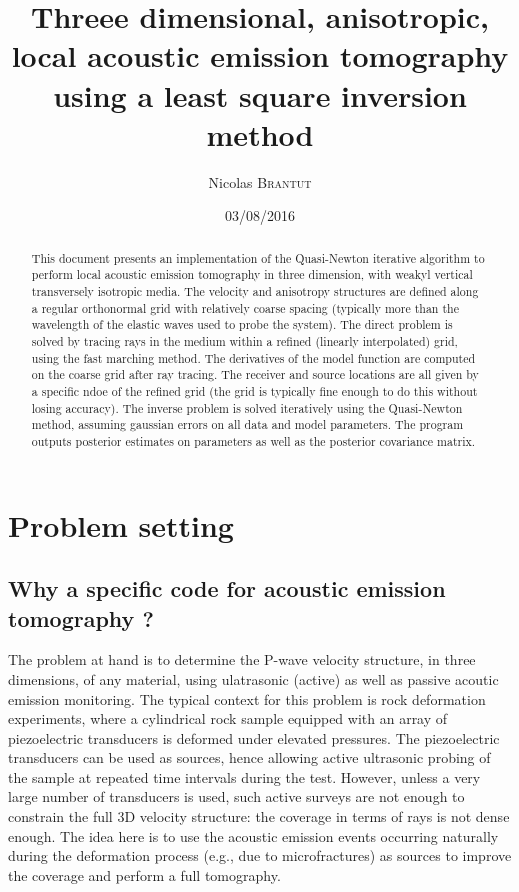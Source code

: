 \documentclass{article}
\title{Threee dimensional, anisotropic, local acoustic emission tomography using a least square inversion method}
\author{Nicolas \textsc{Brantut}}
\date{03/08/2016}
\begin{document}
\maketitle

\begin{abstract}
This document presents an implementation of the Quasi-Newton iterative algorithm to perform local acoustic emission tomography in three dimension, with weakyl vertical transversely isotropic media. The velocity and anisotropy structures are defined along a regular orthonormal grid with relatively coarse spacing (typically more than the wavelength of the elastic waves used to probe the system). The direct problem is solved by tracing rays in the medium within a refined (linearly interpolated) grid, using the fast marching method. The derivatives of the model function are computed on the coarse grid after ray tracing. The receiver and source locations are all given by a specific ndoe of the refined grid (the grid is typically fine enough to do this without losing accuracy). The inverse problem is solved iteratively using the Quasi-Newton method, assuming gaussian errors on all data and model parameters. The program outputs posterior estimates on parameters as well as the posterior covariance matrix.
\end{abstract}

\section{Problem setting}

\subsection{Why a specific code for acoustic emission tomography ?}

The problem at hand is to determine the P-wave velocity structure, in three dimensions, of any material, using ulatrasonic (active) as well as passive acoutic emission monitoring. The typical context for this problem is rock deformation experiments, where a cylindrical rock sample equipped with an array of piezoelectric transducers is deformed under elevated pressures. The piezoelectric transducers can be used as sources, hence allowing active ultrasonic probing of the sample at repeated time intervals during the test. However,  unless a very large number of transducers is used, such active surveys are not enough to constrain the full 3D velocity structure: the coverage in terms of rays is not dense enough. The idea here is to use the acoustic emission events occurring naturally during the deformation process (e.g., due to microfractures) as sources to improve the coverage and perform a full tomography. 
\end{document}
